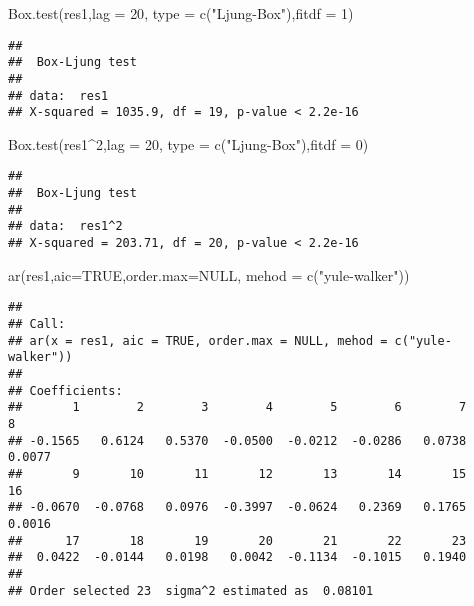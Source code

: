 \documentclass[
]{article}
\newenvironment{Shaded}{\begin{snugshade}}{\end{snugshade}}
\newcommand{\AttributeTok}[1]{\textcolor[rgb]{0.77,0.63,0.00}{#1}}
\newcommand{\ConstantTok}[1]{\textcolor[rgb]{0.00,0.00,0.00}{#1}}
\newcommand{\DecValTok}[1]{\textcolor[rgb]{0.00,0.00,0.81}{#1}}
\newcommand{\FunctionTok}[1]{\textcolor[rgb]{0.00,0.00,0.00}{#1}}
\newcommand{\NormalTok}[1]{#1}
\newcommand{\SpecialCharTok}[1]{\textcolor[rgb]{0.00,0.00,0.00}{#1}}
\newcommand{\StringTok}[1]{\textcolor[rgb]{0.31,0.60,0.02}{#1}}
\begin{document}
\begin{Shaded}
\begin{Highlighting}[]
\FunctionTok{Box.test}\NormalTok{(res1,}\AttributeTok{lag =} \DecValTok{20}\NormalTok{, }\AttributeTok{type =} \FunctionTok{c}\NormalTok{(}\StringTok{"Ljung{-}Box"}\NormalTok{),}\AttributeTok{fitdf =} \DecValTok{1}\NormalTok{) }
\end{Highlighting}
\end{Shaded}

\begin{verbatim}
## 
##  Box-Ljung test
## 
## data:  res1
## X-squared = 1035.9, df = 19, p-value < 2.2e-16
\end{verbatim}

\begin{Shaded}
\begin{Highlighting}[]
\FunctionTok{Box.test}\NormalTok{(res1}\SpecialCharTok{\^{}}\DecValTok{2}\NormalTok{,}\AttributeTok{lag =} \DecValTok{20}\NormalTok{, }\AttributeTok{type =} \FunctionTok{c}\NormalTok{(}\StringTok{"Ljung{-}Box"}\NormalTok{),}\AttributeTok{fitdf =} \DecValTok{0}\NormalTok{) }
\end{Highlighting}
\end{Shaded}

\begin{verbatim}
## 
##  Box-Ljung test
## 
## data:  res1^2
## X-squared = 203.71, df = 20, p-value < 2.2e-16
\end{verbatim}

\begin{Shaded}
\begin{Highlighting}[]
\FunctionTok{ar}\NormalTok{(res1,}\AttributeTok{aic=}\ConstantTok{TRUE}\NormalTok{,}\AttributeTok{order.max=}\ConstantTok{NULL}\NormalTok{, }\AttributeTok{mehod =} \FunctionTok{c}\NormalTok{(}\StringTok{"yule{-}walker"}\NormalTok{))}
\end{Highlighting}
\end{Shaded}

\begin{verbatim}
## 
## Call:
## ar(x = res1, aic = TRUE, order.max = NULL, mehod = c("yule-walker"))
## 
## Coefficients:
##       1        2        3        4        5        6        7        8  
## -0.1565   0.6124   0.5370  -0.0500  -0.0212  -0.0286   0.0738   0.0077  
##       9       10       11       12       13       14       15       16  
## -0.0670  -0.0768   0.0976  -0.3997  -0.0624   0.2369   0.1765   0.0016  
##      17       18       19       20       21       22       23  
##  0.0422  -0.0144   0.0198   0.0042  -0.1134  -0.1015   0.1940  
## 
## Order selected 23  sigma^2 estimated as  0.08101
\end{verbatim}
\end{document}

